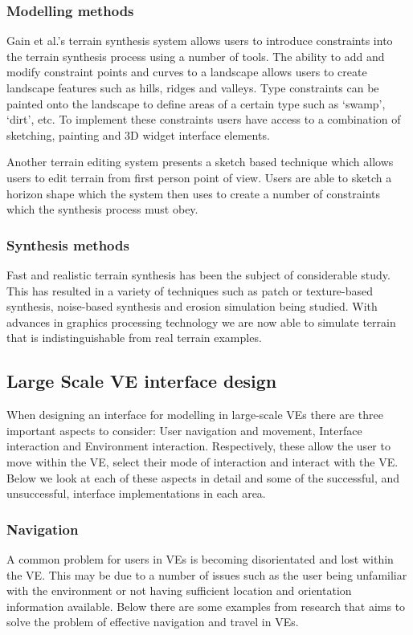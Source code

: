 \documentclass{sig-alternate-05-2015}
\begin{document}
\subsubsection{Modelling methods}
Gain et al.'s terrain synthesis system allows users to introduce constraints into the terrain synthesis process using a number of tools\cite{Gain2015}. The ability to add and modify constraint points and curves to a landscape allows users to create landscape features such as hills, ridges and valleys. Type constraints can be painted onto the landscape to define areas of a certain type such as `swamp', `dirt', etc. To implement these constraints users have access to a combination of sketching, painting and 3D widget interface elements. 

Another terrain editing system presents a sketch based technique which allows users to  edit terrain from first person point of view\cite{Tasse2014}. Users are able to sketch a horizon shape which the system then uses to create a number of constraints which the synthesis process must obey.
\subsubsection{Synthesis methods}
 Fast and realistic terrain synthesis has been the subject of considerable study. This has resulted in a variety of techniques such as patch or texture-based synthesis\cite{Cruz2015, Tasse2012}, noise-based synthesis\cite{Musgrave1989} and erosion simulation\cite{Anh2007} being studied. With advances in graphics processing technology we are now able to simulate terrain that is indistinguishable from real terrain examples\cite{Gain2015}. 

\subsection{Large Scale VE interface design}
When designing an interface for modelling in large-scale VEs there are three important aspects to consider: User navigation and movement, Interface interaction and Environment interaction\cite{Bowman2001}. Respectively, these allow the user to move within the VE, select their mode of interaction and interact with the VE. Below we look at each of these aspects in detail and some of the successful, and unsuccessful, interface implementations in each area.
\subsubsection{Navigation}
A common problem for users in VEs is becoming disorientated and lost within the VE\cite{Darken1993}. This may be due to a number of issues such as the user being unfamiliar with the environment or not having sufficient location and orientation information available. Below there are some examples from research that aims to solve the problem of effective navigation and travel in VEs.
\end{document}
